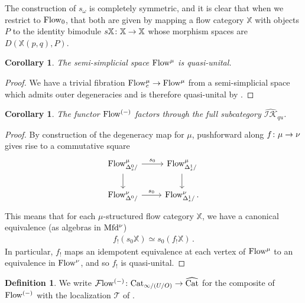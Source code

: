 \documentclass[10pt]{amsart}
\numberwithin{equation}{section}
\newtheorem{cor}[prop]{Corollary}
\theoremstyle{definition}
\newtheorem{definition}[prop]{Definition}
\newcommand{\Flow}{\cF\mathrm{low}\vphantom{w}}
\newcommand{\PreFlow}{\mathrm{Flow}\vphantom{w}}
\newcommand{\Cat}{\mathrm{Cat}\vphantom{t}}
\newcommand{\CatHat}{\widehat{\mathrm{Cat}}\vphantom{t}}
\newcommand{\Mfd}{\mathrm{Mfd}\vphantom{d}}
\newcommand{\bX}{\mathbb{X}}
\newcommand{\cF}{\mathcal{F}}
\newcommand{\cT}{\mathcal{T}}
\newcommand{\IK}{\mathcal{IK}}
\renewcommand{\to}{\mathchoice{\longrightarrow}{\rightarrow}{}{}}
\begin{document}
The construction of $s_{\omega}$ is completely symmetric, and it is clear that when we restrict to $\PreFlow_{0}$, that both are given by mapping a flow category $\bX$ with objects $P$ to the identity bimodule $s\bX \colon \bX \to \bX$ whose morphism spaces are $D(\bX(p,q), P)$.

\begin{cor}\label{cor:flow_is_qu}
	The semi-simplicial space $\PreFlow^{\mu}$ is quasi-unital.
\end{cor}

\begin{proof}
	We have a trivial fibration $\PreFlow^{\mu}_{c} \to \PreFlow^{\mu}$ from a semi-simplicial space which admits outer degeneracies and is therefore quasi-unital by .
\end{proof}

\begin{cor}\label{cor:PreFlow_lands_in_IK_qu}
	The functor $\PreFlow^{(-)}$ factors through the full subcategory $\widehat{\IK}_{qu}$.
\end{cor}
\begin{proof}
	By construction of the degeneracy map for $\mu$, pushforward along $f\colon \mu \to \nu$ gives rise to a commutative square
	\begin{equation*}
		\begin{tikzcd}
			\PreFlow^{\mu}_{\Delta^{0}_{s}/} \arrow[r, "s_{0}"] \arrow[d]      &   \PreFlow^{\mu}_{\Delta^{1}_{s}/}  \arrow[d] \\
			\PreFlow^{\nu}_{\Delta^{0}/}  \arrow[r, "s_{0}"]               &   \PreFlow^{\nu}_{\Delta^{1}_{s}/}\,.
		\end{tikzcd}
	\end{equation*}
	This means that for each $\mu$-structured flow category $\bX$, we have a canonical equivalence (as algebras in $\Mfd^{\nu}$)
	\begin{align*}
		f_{!}(s_{0}\bX) \simeq s_{0}(f_{!}\bX) \,.
	\end{align*}
	In particular, $f_{!}$ maps an idempotent equivalence at each vertex of $\PreFlow^{\mu}$ to an equivalence in $\PreFlow^{\nu}$, and so $f_{!}$ is quasi-unital.
\end{proof}
\begin{definition}\label{def:PreFlow_functor}
	We write $\Flow^{(-)} \colon \Cat_{\infty /(U/O)} \to \CatHat$ for the composite of $\PreFlow^{(-)}$ with the localization $\cT$ of .
\end{definition}
\end{document}
